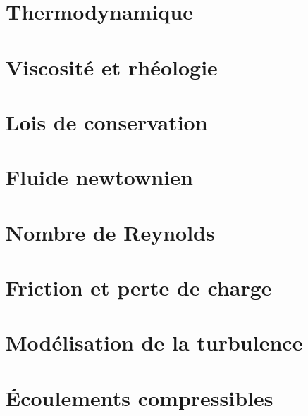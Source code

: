 \documentclass[10pt,a4paper,twocolumn,fleqn]{article}
\begin{document}
\section{Thermodynamique}


\section{Viscosité et rhéologie}\label{sec:rheo}


\section{Lois de conservation}


\section{Fluide newtownien}


\section{Nombre de Reynolds}


\section{Friction et perte de charge}


\section{Modélisation de la turbulence}


\section{Écoulements compressibles}\label{sec:compress}

\end{document}
